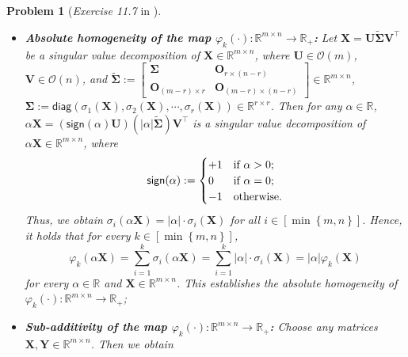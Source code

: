 \documentclass[11pt]{article}
\newtheorem{problem}{Problem}
\numberwithin{equation}{problem}
\begin{document}
\begin{problem} [\emph{Exercise 11.7} in \cite{calafiore2014optimization}]
{\begin{enumerate} [label=(\roman*)]
\begin{itemize}
        \item \textbf{Absolute homogeneity of the map $\varphi_k (\cdot): \mathbb{R}^{m \times n} \rightarrow \mathbb{R}_{+}$:} Let $\mathbf{X} = \mathbf{U} \tilde{\mathbf{\Sigma}} \mathbf{V}^{\top}$ be a singular value decomposition of $\mathbf{X} \in \mathbb{R}^{m \times n}$, where $\mathbf{U} \in \mathcal{O}(m)$, $\mathbf{V} \in \mathcal{O}(n)$, and $\tilde{\mathbf{\Sigma}} := \begin{bmatrix} \mathbf{\Sigma} & \mathbf{O}_{r \times (n-r)} \\
        \mathbf{O}_{(m-r) \times r} & \mathbf{O}_{(m-r) \times (n-r)} \end{bmatrix} \in \mathbb{R}^{m \times n}$, $\mathbf{\Sigma} := \textsf{diag} \left( \sigma_1 (\mathbf{X}), \sigma_2 (\mathbf{X}), \cdots, \sigma_r (\mathbf{X}) \right) \in \mathbb{R}^{r \times r}$. Then for any $\alpha \in \mathbb{R}$, $\alpha \mathbf{X} = \left( \textsf{sign} (\alpha) \mathbf{U} \right) \left( \left| \alpha \right| \tilde{\mathbf{\Sigma}} \right) \mathbf{V}^{\top}$ is a singular value decomposition of $\alpha \mathbf{X} \in \mathbb{R}^{m \times n}$, where
        \begin{equation*}
            \textsf{sign}(\alpha) :=
            \begin{cases}
                +1 & \textnormal{if } \alpha > 0; \\
                0 & \textnormal{if } \alpha = 0; \\
                -1 & \textnormal{otherwise.}
            \end{cases}
        \end{equation*}
        Thus, we obtain $\sigma_i \left( \alpha \mathbf{X} \right) = \left| \alpha \right| \cdot \sigma_i (\mathbf{X})$ for all $i \in \left[ \min \left\{ m, n \right\} \right]$. Hence, it holds that for every $k \in \left[ \min \left\{ m, n \right\} \right]$,
        \begin{equation}
            \label{eqn2.13}
            \varphi_k \left( \alpha \mathbf{X} \right)
            = \sum_{i=1}^{k} \sigma_i \left( \alpha \mathbf{X} \right)
            = \sum_{i=1}^{k} \left| \alpha \right| \cdot \sigma_i (\mathbf{X})
            = \left| \alpha \right| \varphi_k (\mathbf{X})
        \end{equation}
        for every $\alpha \in \mathbb{R}$ and $\mathbf{X} \in \mathbb{R}^{m \times n}$. This establishes the absolute homogeneity of $\varphi_k (\cdot): \mathbb{R}^{m \times n} \rightarrow \mathbb{R}_{+}$;
        \item \textbf{Sub-additivity of the map $\varphi_k (\cdot): \mathbb{R}^{m \times n} \rightarrow \mathbb{R}_{+}$:} Choose any matrices $\mathbf{X}, \mathbf{Y} \in \mathbb{R}^{m \times n}$. Then we obtain

\end{itemize}
\end{enumerate}}
\end{problem}
\end{document}
